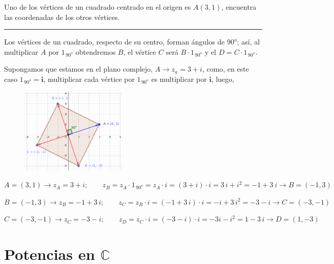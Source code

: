 \vspace{5mm}
\begin{miejercicio}

Uno de los vértices de	un cuadrado centrado en el origen es $A(3,1)$, encuentra las coordenadas de los otros vértices.

\rule{250pt}{0.5pt}

\vspace{2mm} 
\begin{multicols}{2}
Los vértices de un cuadrado, respecto de su centro, forman ángulos de $90^o$; así, al multiplicar $A$ por $1_{\, 90^o}$ obtendremos $B$, el vértice $C$ será $B\cdot 1_{\, 90^o}$ y el $D=C\cdot 1_{\, 90^o}$. 

\vspace{2mm} Supongamos que estamos en el plano complejo, $A\to z_a=3+i$, como, en este caso $1_{\, 90^o}=\boldsymbol i$, multiplicar cada vértice por $1_{\, 90^o}$ es multiplicar por $\boldsymbol i$, luego,

\begin{figure}[H]
	\centering
	\includegraphics[width=0.45\textwidth]{img-c/comp11.png}
\end{figure}
\end{multicols}
$A=(3,1) \to z_A=3+i;\qquad z_B=z_A\cdot 1_{\, 90^o}=z_A \cdot i =(3+i)\cdot i=3\, i+i^2=-1+3\ i \to B=(-1,3)$

\vspace{2mm} $B=(-1,3) \to z_B=-1+3\, i;\qquad z_C=z_B \cdot i =(-1+3\, i)\cdot i=-i+3\, i^2=-3- i \to C=(-3,-1)$

\vspace{2mm} $C=(-3,-1) \to z_C=-3- i;\qquad z_D=z_C \cdot i =(-3-i)\cdot i=-3i-i^2=1-3\, i \to D=(1,-3)$
\end{miejercicio}

		

\vspace{1cm}
\section{Potencias en $\mathbb C$}
\vspace{0.5cm}


